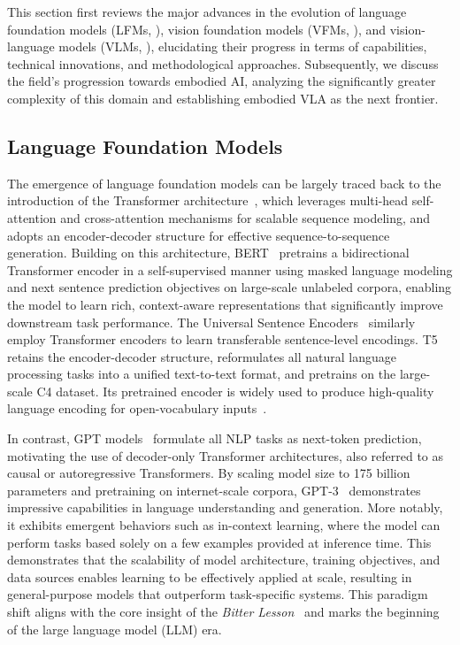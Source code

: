 \documentclass[10pt, a4paper, logo, copyright]{googledeepmind} %
\begin{document}
This section first reviews the major advances in the evolution of language foundation models (LFMs, ), vision foundation models (VFMs, ), and vision-language models (VLMs, ), elucidating their progress in terms of capabilities, technical innovations, and methodological approaches. Subsequently, we discuss the field's progression towards embodied AI, analyzing the significantly greater complexity of this domain and establishing embodied VLA as the next frontier.

\subsection{Language Foundation Models}
\label{sec:lfms}

The emergence of language foundation models can be largely traced back to the introduction of the Transformer architecture~\cite{vaswani2017attention}, which leverages multi-head self-attention and cross-attention mechanisms for scalable sequence modeling, and adopts an encoder-decoder structure for effective sequence-to-sequence generation. Building on this architecture, BERT~\cite{devlin2019bert} pretrains a bidirectional Transformer encoder in a self-supervised manner using masked language modeling and next sentence prediction objectives on large-scale unlabeled corpora, enabling the model to learn rich, context-aware representations that significantly improve downstream task performance. The Universal Sentence Encoders~\cite{cer2018universal, yang2019multilingual} similarly employ Transformer encoders to learn transferable sentence-level encodings. T5~\cite{raffel2020exploring} retains the encoder-decoder structure, reformulates all natural language processing tasks into a unified text-to-text format, and pretrains on the large-scale C4 dataset. Its pretrained encoder is widely used to produce high-quality language encoding for open-vocabulary inputs~\cite{liu2024rdt}. 

In contrast, GPT models~\cite{radford2018improving, radford2019language, brown2020language} formulate all NLP tasks as next-token prediction, motivating the use of decoder-only Transformer architectures, also referred to as causal or autoregressive Transformers. By scaling model size to 175 billion parameters and pretraining on internet-scale corpora, GPT-3~\cite{brown2020language} demonstrates impressive capabilities in language understanding and generation. More notably, it exhibits emergent behaviors such as in-context learning, where the model can perform tasks based solely on a few examples provided at inference time. This demonstrates that the scalability of model architecture, training objectives, and data sources enables learning to be effectively applied at scale, resulting in general-purpose models that outperform task-specific systems. This paradigm shift aligns with the core insight of the \textit{Bitter Lesson}~\cite{sutton2019bitter} and marks the beginning of the large language model (LLM) era.
\end{document}
